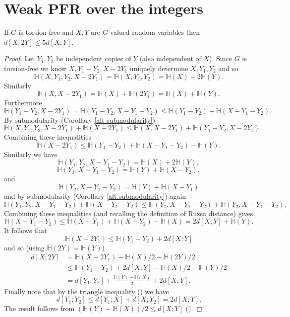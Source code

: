 \chapter{Weak PFR over the integers}

\begin{lemma}\label{torsion-free-doubling}\leanok
If $G$ is torsion-free and $X,Y$ are $G$-valued random variables then $d[X;2Y]\leq 5d[X;Y]$.
\end{lemma}
\begin{proof}
\leanok
Let $Y_1,Y_2$ be independent copies of $Y$ (also independent of $X$). Since $G$ is torsion-free we know $X,Y_1-Y_2,X-2Y_1$ uniquely determine $X,Y_1,Y_2$ and so
\[\mathbb{H}(X,Y_1,Y_2,X-2Y_1)=\mathbb{H}(X,Y_1,Y_2)=\mathbb{H}(X)+2\mathbb{H}(Y).\]
Similarly
\[\mathbb{H}(X,X-2Y_1)=\mathbb{H}(X)+\mathbb{H}(2Y_1)=\mathbb{H}(X)+\mathbb{H}(Y).\]
Furthermore
\[\mathbb{H}(Y_1-Y_2,X-2Y_1)=\mathbb{H}(Y_1-Y_2,X-Y_1-Y_2)\leq \mathbb{H}(Y_1-Y_2)+\mathbb{H}(X-Y_1-Y_2).\]
By submodularity (Corollary \ref{alt-submodularity})
\[\mathbb{H}(X,Y_1,Y_2,X-2Y_1)+\mathbb{H}(X-2Y_1)\leq \mathbb{H}(X,X-2Y_1)+\mathbb{H}(Y_1-Y_2,X-2Y_1).\]
Combining these inequalities
\[\mathbb{H}(X-2Y_1)\leq \mathbb{H}(Y_1-Y_2)+\mathbb{H}(X-Y_1-Y_2)-\mathbb{H}(Y).\]
Similarly we have
\[\mathbb{H}(Y_1,Y_2,X-Y_1-Y_2)=\mathbb{H}(X)+2\mathbb{H}(Y),\]
\[\mathbb{H}(Y_1,X-Y_1-Y_2)=\mathbb{H}(Y)+\mathbb{H}(X-Y_2),\]
and
\[\mathbb{H}(Y_2,X-Y_1-Y_2)=\mathbb{H}(Y)+\mathbb{H}(X-Y_1)\]
and by submodularity (Corollary \ref{alt-submodularity}) again
\[\mathbb{H}(Y_1,Y_2,X-Y_1-Y_2)+ \mathbb{H}(X-Y_1-Y_2)\leq \mathbb{H}(Y_1,X-Y_1-Y_2)+\mathbb{H}(Y_2,X-Y_1-Y_2).\]
Combining these inequalities (and recalling the definition of Ruzsa distance) gives
\[\mathbb{H}(X-Y_1-Y_2)\leq \mathbb{H}(X-Y_1)+\mathbb{H}(X-Y_2)-\mathbb{H}(X)=2d[X;Y]+\mathbb{H}(Y).\]
It follows that
\[\mathbb{H}(X-2Y_1)\leq \mathbb{H}(Y_1-Y_2)+2d[X;Y]\]
and so (using $\mathbb{H}(2Y)=\mathbb{H}(Y)$)
\begin{align*}
d[X;2Y]
&=\mathbb{H}(X-2Y_1)-\mathbb{H}(X)/2-\mathbb{H}(2Y)/2\\
&\leq \mathbb{H}(Y_1-Y_2)+2d[X;Y]-\mathbb{H}(X)/2-\mathbb{H}(Y)/2\\
&= d[Y_1;Y_2]+\frac{\mathbb{H}(Y)-\mathbb{H}(X)}{2}+2d[X;Y].
\end{align*}
Finally note that by the triangle inequality () we have
\[d[Y_1;Y_2]\leq d[Y_1;X]+d[X;Y_2]=2d[X;Y].\]
The result follows from $(\mathbb{H}(Y)-\mathbb{H}(X))/2\leq d[X;Y]$ ().
\end{proof}


